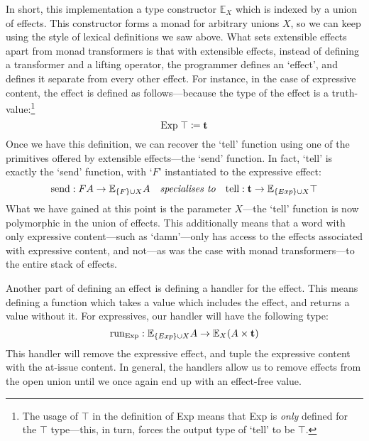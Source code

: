 In short, this implementation a type constructor $\mathbb{E}_X$ which
is indexed by a union of effects. This constructor forms a monad for
arbitrary unions $X$, so we can keep using the style of lexical
definitions we saw above.
%
What sets extensible effects apart from monad transformers is that
with extensible effects, instead of defining a transformer and a
lifting operator, the programmer defines an `effect', and defines it
separate from every other effect. For instance, in the case of
expressive content, the effect is defined as follows---because the
type of the effect is a truth-value:\footnote{%
  The usage of $\top$ in the definition of Exp means that Exp is
  \emph{only} defined for the $\top$ type---this, in turn, forces the
  output type of `tell' to be $\top$.
}
\[
  \text{Exp}\;\top\coloneqq\mathbf{t}
\]
Once we have this definition, we can recover the `tell' function using
one of the primitives offered by extensible effects---the `send'
function. In fact, `tell' is exactly the `send' function, with `$F$'
instantiated to the expressive effect:
\[
  \text{send} : FA\rightarrow\mathbb{E}_{\{F\}\cup X}A
  \quad
  \textit{specialises to}
  \quad
  \text{tell} : \mathbf{t}\rightarrow\mathbb{E}_{\{Exp\}\cup X}\top
\]
What we have gained at this point is the parameter $X$---the `tell'
function is now polymorphic in the union of effects. This additionally
means that a word with only expressive content---such as `damn'---only
has access to the effects associated with expressive content, and
not---as was the case with monad transformers---to the entire stack of
effects.

Another part of defining an effect is defining a handler for the
effect. This means defining a function which takes a value which
includes the effect, and returns a value without it. For expressives,
our handler will have the following type:
\[
  \text{run}_{\text{Exp}} : \mathbb{E}_{\{Exp\}\cup X}A\rightarrow\mathbb{E}_{X}(A\times\mathbf{t})
\]
This handler will remove the expressive effect, and tuple the
expressive content with the at-issue content. In general, the handlers
allow us to remove effects from the open union until we once again end
up with an effect-free value.

